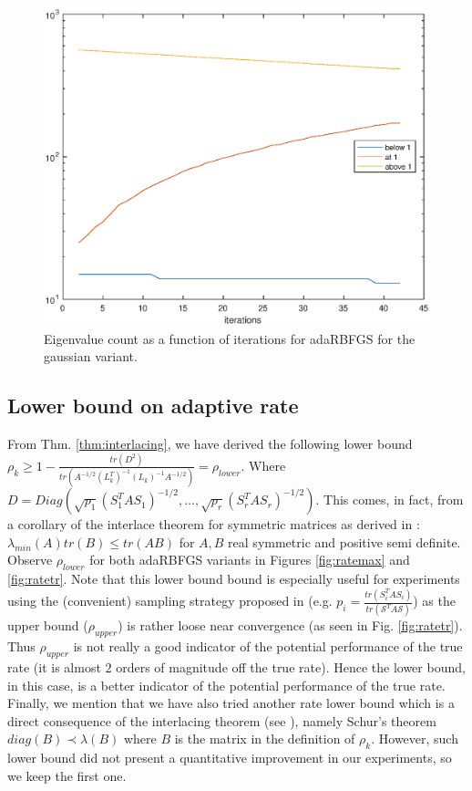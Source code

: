 \documentclass[12pt,conference,compsocconf]{IEEEtran}
\begin{document}
\begin{figure}[H]
  \centering
  \includegraphics[height=0.7\columnwidth,width=1.0\columnwidth]{eigcountiter_gauss.eps}
  
  \vspace{-2mm}
  \caption{Eigenvalue count as a function of iterations for adaRBFGS for the gaussian variant. \label{fig:eigcountgauss}}  
  
\end{figure}

\subsection{Lower bound on adaptive rate}\label{sect:adaptive rate}
From Thm. \ref{thm:interlacing}, we have derived the following lower bound $\rho_k \geq 1-\frac{tr(D^2)}{tr(A^{-1/2}(L_k^T)^{-1}(L_k)^{-1}A^{-1/2})}=\rho_{lower}$. Where $D=Diag(\sqrt{p_1}(S_1^TAS_1)^{-1/2},\ldots,\sqrt{p_r}(S_r^TAS_r)^{-1/2})$. This comes, in fact, from a corollary of the interlace theorem for symmetric matrices as derived in \cite{J Tao,Fang} : $\lambda_{min}(A)tr(B)\leq tr(AB)$ for $A,B$ real symmetric and positive semi definite. Observe $\rho_{lower}$ for both adaRBFGS variants in Figures \ref{fig:ratemax} and \ref{fig:ratetr}. Note that this lower bound bound is especially useful for experiments using the (convenient) sampling strategy proposed in \cite{Gower1} (e.g. $p_i=\frac{tr(S_i^TAS_i)}{tr(\mathcal{S}^TA\mathcal{S})}$) as the upper bound ($\rho_{upper}$) is rather loose near convergence (as seen in Fig. \ref{fig:ratetr}). Thus $\rho_{upper}$ is not really a good indicator of the potential performance of the true rate (it is almost $2$ orders of magnitude off the true rate). Hence the lower bound, in this case, is a better indicator of the potential performance of the true rate.\\
Finally, we mention that we have also tried another rate lower bound which is a direct consequence of the interlacing theorem (see \cite{J Tao}), namely Schur's theorem $diag(B) \prec \lambda(B)$ where $B$ is the matrix in the definition of $\rho_k$. However, such lower bound did not present a quantitative improvement in our experiments, so we keep the first one.
\end{document}
